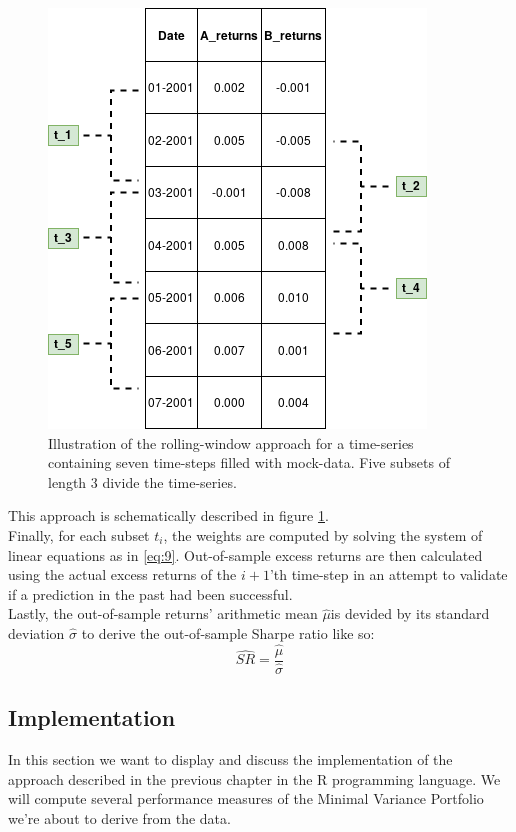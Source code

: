 \begin{figure}[h]
  \begin{center}
    \includegraphics[width=.50\textwidth]{Bilder/rolling_window.png}
    \caption{Illustration of the rolling-window approach for a time-series containing seven time-steps filled with mock-data. Five subsets of length 3 divide the time-series.}
    \label{fig:rolling_window}
  \end{center}
\end{figure}
This approach is schematically described in figure \ref{fig:rolling_window}.\\

Finally, for each subset $t_i$, the weights are computed by solving the system of linear equations as in \ref{eq:9}. Out-of-sample excess returns are then calculated using the actual excess returns of the $i+1$'th time-step in an attempt to validate if a prediction in the past had been successful.\\

Lastly, the out-of-sample returns' arithmetic mean $\hat{\mu}$is devided by its standard deviation $\hat{\sigma}$ to derive the out-of-sample Sharpe ratio like so:
\begin{equation}\label{eq:out-of-sample-sharpe}
\hat{SR} = \frac{\hat{\mu}}{\hat{\sigma}}
\end{equation}

\subsection{Implementation}
In this section we want to display and discuss the implementation of the approach described in the previous chapter in the R programming language. We will compute several performance measures of the Minimal Variance Portfolio we're about to derive from the data.

